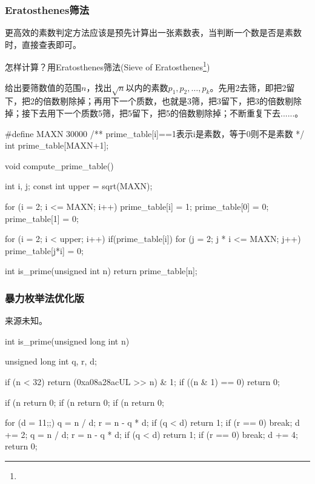 \subsubsection{Eratosthenes筛法}
更高效的素数判定方法应该是预先计算出一张素数表，当判断一个数是否是素数时，直接查表即可。

怎样计算？用Eratosthenes筛法(Sieve of Eratosthenes\footnote{})

给出要筛数值的范围$n$，找出$\sqrt{n}$以内的素数$p_{1},p_{2},\dots,p_{k}$。先用2去筛，即把2留下，把2的倍数剔除掉；再用下一个质数，也就是3筛，把3留下，把3的倍数剔除掉；接下去用下一个质数5筛，把5留下，把5的倍数剔除掉；不断重复下去......。

\begin{Code}
#define MAXN 30000
/** prime_table[i]==1表示i是素数，等于0则不是素数 */
int prime_table[MAXN+1];

void compute_prime_table() {
    int i, j;
    const int upper = sqrt(MAXN);

    for (i = 2; i <= MAXN; i++) prime_table[i] = 1;
    prime_table[0] = 0;
    prime_table[1] = 0;

    for (i = 2; i < upper; i++) if(prime_table[i]) {
        for (j = 2; j * i <= MAXN; j++) prime_table[j*i] = 0;
    }
}

int is_prime(unsigned int n) {
    return prime_table[n];
}
\end{Code}

\subsubsection{暴力枚举法优化版}
来源未知。

\begin{Code}
int is_prime(unsigned long int n) {
    unsigned long int q, r, d;

    if (n < 32)
        return (0xa08a28acUL >> n) & 1;
    if ((n & 1) == 0)
        return 0;

    if (n %
        return 0;
    if (n %
        return 0;
    if (n %
        return 0;

    for (d = 11;;) {
        q = n / d;
        r = n - q * d;
        if (q < d)
            return 1;
        if (r == 0)
            break;
        d += 2;
        q = n / d;
        r = n - q * d;
        if (q < d)
            return 1;
        if (r == 0)
            break;
        d += 4;
    }
    return 0;
}
\end{Code}


